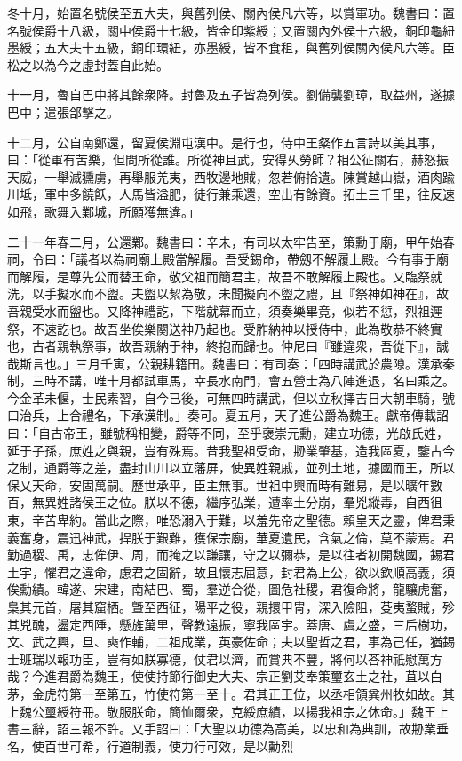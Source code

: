 \begin{pinyinscope}
冬十月，始置名號侯至五大夫，與舊列侯、關內侯凡六等，以賞軍功。魏書曰：置名號侯爵十八級，關中侯爵十七級，皆金印紫綬；又置關內外侯十六級，銅印龜紐墨綬；五大夫十五級，銅印環紐，亦墨綬，皆不食租，與舊列侯關內侯凡六等。臣松之以為今之虛封蓋自此始。

十一月，魯自巴中將其餘衆降。封魯及五子皆為列侯。劉備襲劉璋，取益州，遂據巴中；遣張郃擊之。

十二月，公自南鄭還，留夏侯淵屯漢中。是行也，侍中王粲作五言詩以美其事，曰：「從軍有苦樂，但問所從誰。所從神且武，安得乆勞師？相公征關右，赫怒振天威，一舉滅獯虜，再舉服羌夷，西牧邊地賊，忽若俯拾遺。陳賞越山嶽，酒肉踰川坻，軍中多饒飫，人馬皆溢肥，徒行兼乘還，空出有餘資。拓土三千里，往反速如飛，歌舞入鄴城，所願獲無違。」

二十一年春二月，公還鄴。魏書曰：辛未，有司以太牢告至，策勳于廟，甲午始春祠，令曰：「議者以為祠廟上殿當解履。吾受錫命，帶劔不解履上殿。今有事于廟而解履，是尊先公而替王命，敬父祖而簡君主，故吾不敢解履上殿也。又臨祭就洗，以手擬水而不盥。夫盥以絜為敬，未聞擬向不盥之禮，且『祭神如神在』，故吾親受水而盥也。又降神禮訖，下階就幕而立，須奏樂畢竟，似若不愆，烈祖遲祭，不速訖也。故吾坐俟樂闋送神乃起也。受胙納神以授侍中，此為敬恭不終實也，古者親執祭事，故吾親納于神，終抱而歸也。仲尼曰『雖違衆，吾從下』，誠哉斯言也。」三月壬寅，公親耕籍田。魏書曰：有司奏：「四時講武於農隙。漢承秦制，三時不講，唯十月都試車馬，幸長水南門，會五營士為八陣進退，名曰乘之。今金革未偃，士民素習，自今已後，可無四時講武，但以立秋擇吉日大朝車騎，號曰治兵，上合禮名，下承漢制。」奏可。夏五月，天子進公爵為魏王。獻帝傳載詔曰：「自古帝王，雖號稱相變，爵等不同，至乎襃崇元勳，建立功德，光啟氏姓，延于子孫，庶姓之與親，豈有殊焉。昔我聖祖受命，刱業肇基，造我區夏，鑒古今之制，通爵等之差，盡封山川以立藩屏，使異姓親戚，並列土地，據國而王，所以保乂天命，安固萬嗣。歷世承平，臣主無事。世祖中興而時有難易，是以曠年數百，無異姓諸侯王之位。朕以不德，繼序弘業，遭率土分崩，羣兇縱毒，自西徂東，辛苦卑約。當此之際，唯恐溺入于難，以羞先帝之聖德。賴皇天之靈，俾君秉義奮身，震迅神武，捍朕于艱難，獲保宗廟，華夏遺民，含氣之倫，莫不蒙焉。君勤過稷、禹，忠侔伊、周，而掩之以謙讓，守之以彌恭，是以往者初開魏國，錫君土宇，懼君之違命，慮君之固辭，故且懷志屈意，封君為上公，欲以欽順高義，須俟勳績。韓遂、宋建，南結巴、蜀，羣逆合從，圖危社稷，君復命將，龍驤虎奮，梟其元首，屠其窟栖。曁至西征，陽平之役，親擐甲冑，深入險阻，芟夷蝥賊，殄其兇醜，盪定西陲，懸旌萬里，聲教遠振，寧我區宇。蓋唐、虞之盛，三后樹功，文、武之興，旦、奭作輔，二祖成業，英豪佐命；夫以聖哲之君，事為己任，猶錫士班瑞以報功臣，豈有如朕寡德，仗君以濟，而賞典不豐，將何以荅神祇慰萬方哉？今進君爵為魏王，使使持節行御史大夫、宗正劉艾奉策璽玄土之社，苴以白茅，金虎符第一至第五，竹使符第一至十。君其正王位，以丞相領兾州牧如故。其上魏公璽綬符冊。敬服朕命，簡恤爾衆，克綏庶績，以揚我祖宗之休命。」魏王上書三辭，詔三報不許。又手詔曰：「大聖以功德為高美，以忠和為典訓，故刱業垂名，使百世可希，行道制義，使力行可效，是以勳烈
\end{pinyinscope}

